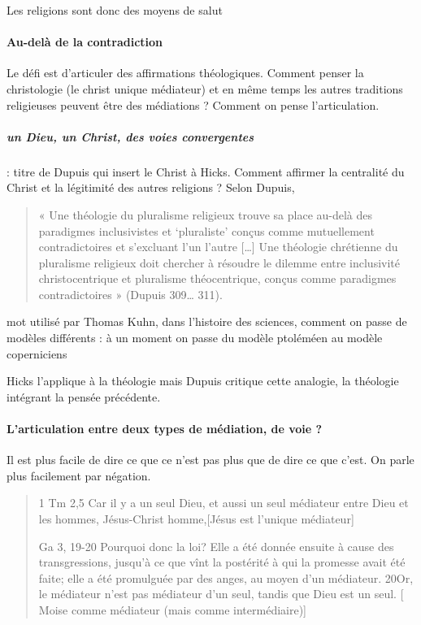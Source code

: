  \begin{Synthesis}
 Les religions sont donc des moyens de salut
 \end{Synthesis}
 

 
  
 \paragraph{Au-delà de la contradiction} Le défi est d'articuler des affirmations théologiques.
 Comment penser la christologie (le christ unique médiateur) et en même temps les autres traditions religieuses peuvent être des médiations ? Comment on pense l'articulation.
 \subparagraph{un Dieu, un Christ, des voies convergentes} : titre de Dupuis qui insert le Christ à Hicks. Comment affirmer la centralité du Christ et la légitimité des autres religions ? 
 Selon Dupuis,
 \begin{quote}
     « Une théologie du pluralisme religieux trouve sa place au-delà des paradigmes inclusivistes et ‘pluraliste’ conçus comme mutuellement contradictoires et s’excluant l’un l’autre […] Une théologie chrétienne du pluralisme religieux doit chercher à résoudre le dilemme entre inclusivité christocentrique et pluralisme théocentrique, conçus comme paradigmes contradictoires » (Dupuis 309… 311). 
 \end{quote}
 
 
 \begin{Def}[paradigme]
 mot utilisé par Thomas Kuhn, dans l'histoire des sciences, comment on passe de modèles différents : à un moment on passe du modèle ptoléméen au modèle coperniciens 
 \end{Def}
  Hicks l'applique à la théologie mais Dupuis critique cette analogie, la théologie intégrant la pensée précédente.
 
 
 \paragraph{L’articulation entre deux types de médiation, de voie ? 
} 
 Il est plus facile de dire ce que ce n’est pas plus que de dire ce que c’est. On parle plus facilement par négation.
 
 \begin{quote}
     1 Tm 2,5 Car il y a un seul Dieu, et aussi un seul médiateur entre Dieu et les hommes, Jésus-Christ homme,[Jésus est l’unique médiateur]
     
Ga 3, 19-20 Pourquoi donc la loi? Elle a été donnée ensuite à cause des transgressions, jusqu'à ce que vînt la postérité à qui la promesse avait été faite; elle a été promulguée par des anges, au moyen d'un médiateur. 20Or, le médiateur n'est pas médiateur d'un seul, tandis que Dieu est un seul. [ Moise comme médiateur (mais comme intermédiaire)]
 \end{quote}

